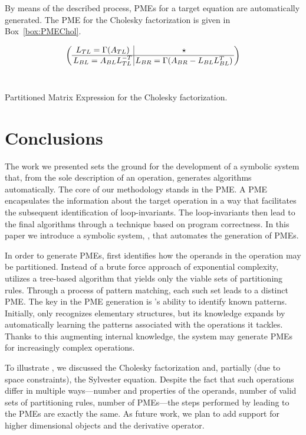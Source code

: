 \documentclass{llncs}
\newcommand{\click}{{\sc{Cl\makebox[.58\width][c]{1}ck}}}
\begin{document}
By means of the described process, PMEs for a target equation are automatically
generated. The PME for the Cholesky factorization is given in Box~\ref{box:PMEChol}.

\begin{mybox} \centering
\vspace{-3mm}
	\renewcommand{\arraystretch}{1.4}
	$$\left( {\begin{array}{@{\,}c@{\,}|@{\,}c@{\,}} 
			L_{TL} = \Gamma(A_{TL}) &
			\star \\\hline
			L_{BL} = A_{BL} L_{TL}^{-T} &
			L_{BR} = \Gamma(A_{BR} - L_{BL} L_{BL}^T)
	 \end{array}} \right)$$ \\
\vspace{-3mm}
	\caption{Partitioned Matrix Expression for the Cholesky factorization.} \label{box:PMEChol}
\end{mybox}

\section{Conclusions} \label{sec:conclusions}

The work we presented sets the ground for the development of a
symbolic system that, from the sole description of an operation,
generates algorithms automatically. The core of our methodology stands
in the PME.  A PME encapsulates the information about the target
operation in a way that facilitates the subsequent identification of
loop-invariants. The loop-invariants then lead to the final algorithms
through a technique based on program correctness. In this paper we
introduce a symbolic system, \click{}, that automates the generation of
PMEs.

In order to generate PMEs, \click{} first identifies how the op\-er\-ands in the
operation may be partitioned. Instead of a brute force approach of
exponential complexity, \click{} utilizes a tree-based algorithm that
yields only the viable sets of partitioning rules.
Through a process of pattern matching, each such set leads to a distinct PME. 
The key in the PME generation is \click{}'s ability to identify known patterns. 
Initially, \click{} only recognizes elementary structures, but its
knowledge expands by automatically learning the patterns associated
with the operations it tackles. Thanks to this augmenting
internal knowledge, the system may generate PMEs for increasingly
complex operations.

To illustrate \click{}, we discussed the
Cholesky factorization and, partially (due to space constraints),
the Sylvester equation. Despite the fact
that such operations differ in multiple ways---number and properties
of the operands, number of valid sets of partitioning rules, number of
PMEs---the steps performed by \click{} leading to the PMEs are
exactly the same. As future work, we plan to add support
for higher dimensional objects
and the derivative operator.
\end{document}
